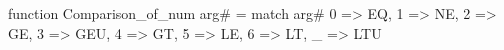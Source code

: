 function Comparison_of_num arg# = match arg# {
  0 => EQ,
  1 => NE,
  2 => GE,
  3 => GEU,
  4 => GT,
  5 => LE,
  6 => LT,
  _ => LTU
}
